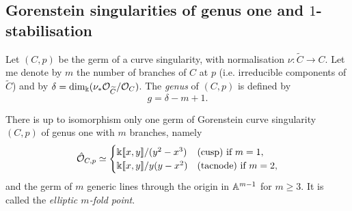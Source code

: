 \subsection{Gorenstein singularities of genus one and $1$-stabilisation}
\begin{dfn}\label{def:genus}
 Let $(C,p)$ be the germ of a curve singularity, with normalisation $\nu\colon\widetilde{C}\to C$. Let me denote by $m$ the number of branches of $C$ at $p$ (i.e. irreducible components of $\widetilde{C}$) and by $\delta=\dim_{\Bbbk}(\nu_*\mathcal{O}_{\widetilde{C}}/\mathcal{O}_C)$. The \emph{genus} of $(C,p)$ is defined by \[g=\delta-m+1.\]
\end{dfn}
\begin{prop}\cite[Proposition A.3]{SMY1}
 There is up to isomorphism only one germ of Gorenstein curve singularity $(C,p)$ of genus one with $m$ branches, namely
 \[\hat{\mathcal{O}}_{C,p}\simeq\begin{cases} \Bbbk[\![x,y]\!]/(y^2-x^3) & \text{(cusp) if } m=1, \\ \Bbbk[\![x,y]\!]/y(y-x^2) &  \text{(tacnode) if } m=2,\end{cases}\]
 and the germ of $m$ generic lines through the origin in $\mathbb{A}^{m-1}$ for $m\geq 3$. It is called the \emph{elliptic $m$-fold point}.
\end{prop}
